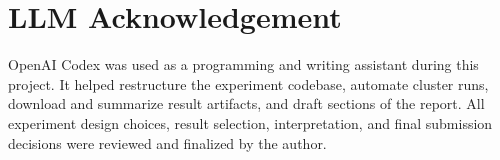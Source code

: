 \documentclass{article}
\begin{document}



\appendix
\section*{LLM Acknowledgement}

OpenAI Codex was used as a programming and writing assistant during this project. It helped restructure the experiment codebase, automate cluster runs, download and summarize result artifacts, and draft sections of the report. All experiment design choices, result selection, interpretation, and final submission decisions were reviewed and finalized by the author.
\end{document}
